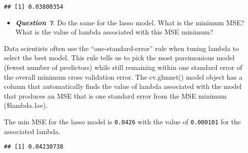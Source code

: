 \documentclass[
]{article}
\newenvironment{Shaded}{\begin{snugshade}}{\end{snugshade}}
\newcommand{\CommentTok}[1]{\textcolor[rgb]{0.56,0.35,0.01}{\textit{#1}}}
\newcommand{\FloatTok}[1]{\textcolor[rgb]{0.00,0.00,0.81}{#1}}
\newcommand{\FunctionTok}[1]{\textcolor[rgb]{0.13,0.29,0.53}{\textbf{#1}}}
\newcommand{\NormalTok}[1]{#1}
\newcommand{\SpecialCharTok}[1]{\textcolor[rgb]{0.81,0.36,0.00}{\textbf{#1}}}
\providecommand{\tightlist}{%
  \setlength{\itemsep}{0pt}\setlength{\parskip}{0pt}}
\begin{document}
\begin{Shaded}
\end{Shaded}

\begin{verbatim}
## [1] 0.03800354
\end{verbatim}

\begin{itemize}
\tightlist
\item
  \textbf{\emph{Question 7}}. Do the same for the lasso model. What is
  the minimum MSE? What is the value of lambda associated with this MSE
  minimum?
\end{itemize}

Data scientists often use the ``one-standard-error'' rule when tuning
lambda to select the best model. This rule tells us to pick the most
parsimonious model (fewest number of predictors) while still remaining
within one standard error of the overall minimum cross validation error.
The cv.glmnet() model object has a column that automatically finds the
value of lambda associated with the model that produces an MSE that is
one standard error from the MSE minimum (\$lambda.1se).

The min MSE for the lasso model is \texttt{0.0426} with the value of
\texttt{0.000101} for the associated lambda.

\begin{Shaded}
\end{Shaded}

\begin{verbatim}
## [1] 0.04230738
\end{verbatim}

\begin{Shaded}
\end{Shaded}
\end{document}
